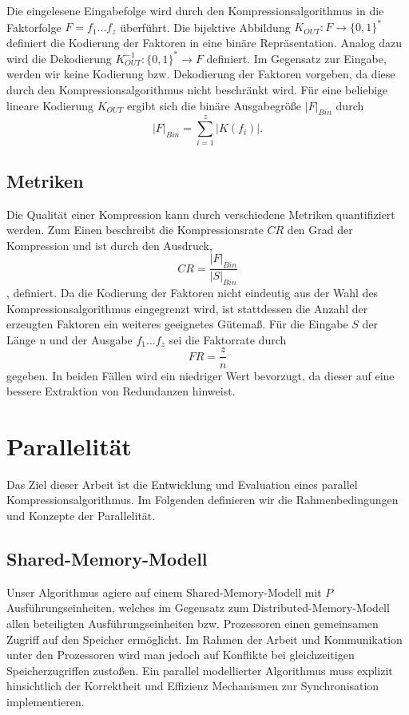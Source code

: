 Die eingelesene Eingabefolge wird durch den Kompressionsalgorithmus in die Faktorfolge $F=f_1...f_z$ überführt. Die bijektive Abbildung $K_{OUT}: F \rightarrow \{0,1\}^*$
definiert die Kodierung der Faktoren in eine binäre Repräsentation. Analog dazu wird die Dekodierung $K^{-1}_{OUT}: \{0,1\}^* \rightarrow F$ definiert. Im Gegensatz zur Eingabe, 
werden wir keine Kodierung bzw. Dekodierung der Faktoren vorgeben, da diese durch den Kompressionsalgorithmus nicht beschränkt wird. Für eine beliebige lineare Kodierung $K_{OUT}$ ergibt 
sich die binäre Ausgabegröße $|F|_{Bin}$ durch
\begin{equation}
    |F|_{Bin} = \sum_{i=1}^{z} |K(f_i)|.
\end{equation}

\subsection{Metriken}
Die Qualität einer Kompression kann durch verschiedene Metriken quantifiziert werden. Zum Einen beschreibt die Kompressionsrate $CR$ den Grad der Kompression und ist durch den
Ausdruck, 
\begin{equation}
    CR = \frac{|F|_{Bin}}{|S|_{Bin}}
\end{equation}
, definiert.
Da die Kodierung der Faktoren nicht eindeutig aus der Wahl des Kompressionsalgorithmus eingegrenzt wird, ist stattdessen die Anzahl der erzeugten Faktoren ein
weiteres geeignetes Gütemaß. Für die Eingabe $S$ der Länge n und der Ausgabe $f_1...f_z$ sei die Faktorrate durch
\begin{equation}
    FR = \frac{z}{n}
\end{equation}
gegeben. In beiden Fällen wird ein niedriger Wert bevorzugt, da dieser auf eine bessere Extraktion von Redundanzen hinweist.

\section{Parallelität}
Das Ziel dieser Arbeit ist die Entwicklung und Evaluation eines parallel Kompressionsalgorithmus. Im Folgenden definieren wir die Rahmenbedingungen und Konzepte der Parallelität.

\subsection{Shared-Memory-Modell}
Unser Algorithmus agiere auf einem Shared-Memory-Modell mit $P$ Ausführungseinheiten, welches im Gegensatz zum Distributed-Memory-Modell allen beteiligten Ausführungseinheiten bzw. 
Prozessoren einen gemeinsamen Zugriff auf den Speicher ermöglicht. Im Rahmen der Arbeit und Kommunikation unter den Prozessoren wird man jedoch auf Konflikte bei gleichzeitigen 
Speicherzugriffen zustoßen. Ein parallel modellierter Algorithmus muss explizit hinsichtlich der Korrektheit und Effizienz Mechanismen zur Synchronisation implementieren.

